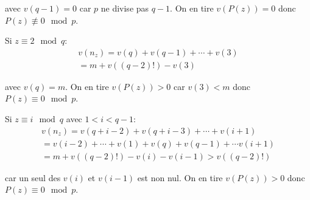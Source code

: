 \begin{enumerate}
avec $v(q-1)=0$ car $p$ ne divise pas $q-1$. On en tire $v(P(z))=0$ donc $P(z) \not\equiv 0 \mod p$.

Si $z\equiv 2 \mod q$:
\begin{multline*}
  v(n_z) = v(q) + v(q-1) + \cdots + v(3)\\ = m + v((q-2)!) - v(3)
\end{multline*}

avec $v(q)=m$. On en tire $v(P(z))>0$ car $v(3)<m$ donc $P(z) \equiv 0 \mod p$.

Si $z\equiv i \mod q$ avec $1<i<q-1$:
\begin{multline*}
  v(n_z) = v(q+i-2) + v(q+i-3) + \cdots + v(i+1)\\ 
= v(i-2) + \cdots + v(1) + v(q) + v(q-1) + \cdots v(i+1)\\
= m +v((q-2)!) - v(i) - v(i-1) > v((q-2)!)
\end{multline*}

car un seul des $v(i)$ et $v(i-1)$ est non nul. On en tire $v(P(z))>0$ donc $P(z) \equiv 0 \mod p$.

\end{enumerate}

